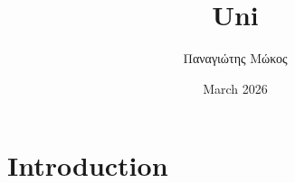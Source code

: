 \documentclass{article}
\title{Uni}
\author{Παναγιώτης Μώκος}
\date{March 2026}
\begin{document}
\maketitle

\section{Introduction}
\end{document}
